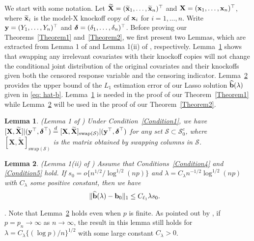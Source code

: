 \documentclass[11pt]{article}
\newcommand{\bdelta}{\mbox{\boldmath $\delta$}}
\newtheorem{lemma}{Lemma}%
\def\X{{\bf X}}
\def\bx{{\bf x}}
\def\y{{\bf y}}
\def\bb{{\bf b}}
\begin{document}
We start with some notation. Let $\widetilde{\X}=(\widetilde{\bx}_1, \ldots, \widetilde{\bx}_n)^{\top}$ and $\X=(\bx_1, \ldots, \bx_n)^{\top}$, where $\widetilde{\bx}_i$ is the model-X knockoff copy of $\bx_i$ for $i=1, \ldots, n$. Write $\y=(Y_1, \ldots, Y_n)^{\top}$ and
$\bdelta=(\delta_1, \ldots, \delta_n)^{\top}$.	
Before proving our Theorems~\ref{Theorem1} and~\ref{Theorem2}, we first present two Lemmas, which are extracted from 
Lemma 1 of \cite{dong2022reproducible} and Lemma 1(ii) of \cite{yu2021confidence}, respectively. 
Lemma~\ref{lemma: Exchangeability} shows that swapping any irrelevant covariates with their knockoff copies will not change the conditional joint distribution of the original covariates and their knockoffs given both the censored response variable and the censoring indicator.  Lemma~\ref{lemma: hatb-estimation-error} provides the  upper bound of the $L_1$ estimation error of our Lasso solution $\widehat{\bb}(\lambda)$ given in \eqref{eq: hat-b}.  
Lemma~\ref{lemma: Exchangeability} is needed 
in the proof of our Theorem~\ref{Theorem1} while  Lemma~\ref{lemma: hatb-estimation-error} will be used in the proof of our Theorem~\ref{Theorem2}.	



\begin{lemma}\label{lemma: Exchangeability}
	\emph{(Lemma 1 of \cite{dong2022reproducible})} Under Condition~\ref{Condition1}, we have  $[\mathbf{X},\widetilde{\mathbf{X}}]|(\y^{\top},\bdelta^{\top})\overset{d}=
	[\mathbf{X},\widetilde{\mathbf{X}}]_{\mathrm{swap}(\mathcal{S})}|(\y^{\top},\bdelta^{\top})$ for any set $\mathcal{S} \subset \mathcal{S}_{0}^c$, where $[\mathbf{X},\widetilde{\mathbf{X}}]_{\mathrm{swap}(\mathcal{S})}$ is the matrix obtained by swapping columns in $\mathcal{S}$.
\end{lemma}


\begin{lemma}\label{lemma: hatb-estimation-error}	
	\emph{(Lemma 1(ii) of \cite{yu2021confidence})} Assume that Conditions~\ref{Condition4} and \ref{Condition5} hold. If $s_0=o\{n^{1/2}/\log^{1/2}(np)\}$ and $\lambda=C_{\lambda}n^{-1/2}\log^{1/2}(np)$ with $C_{\lambda}$ some positive constant, then we have
	\begin{align*}
	&     \|\widehat{\bb}(\lambda)-\bb_0\|_1
	\leq C_{\ell_1}\lambda s_0.
	\end{align*}
\end{lemma}

.  Note that Lemma~\ref{lemma: hatb-estimation-error} holds even when $p$ is finite. As pointed out by \cite{yu2021confidence}, if $p=p_n\to\infty$ as $n\to\infty$, the result in this lemma still holds for  $\lambda=C_{\lambda}\{(\log p)/n\}^{1/2}$ with some large constant $C_{\lambda}>0$.
\end{document}
